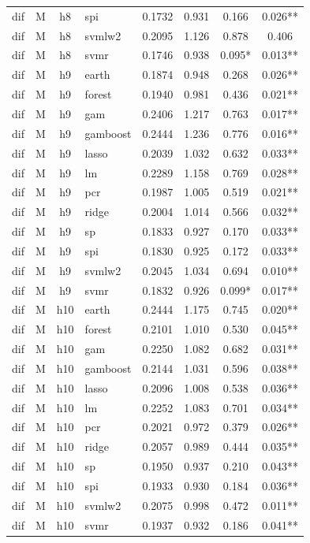 \begin{ThreePartTable}
\begin{longtable}[t]{llclcccc}
dif & M & h8 & spi & 0.1732 & 0.931 & 0.166 & 0.026**\\
dif & M & h8 & svmlw2 & 0.2095 & 1.126 & 0.878 & 0.406\\
dif & M & h8 & svmr & 0.1746 & 0.938 & 0.095* & 0.013**\\
\addlinespace
dif & M & h9 & earth & 0.1874 & 0.948 & 0.268 & 0.026**\\
dif & M & h9 & forest & 0.1940 & 0.981 & 0.436 & 0.021**\\
dif & M & h9 & gam & 0.2406 & 1.217 & 0.763 & 0.017**\\
dif & M & h9 & gamboost & 0.2444 & 1.236 & 0.776 & 0.016**\\
dif & M & h9 & lasso & 0.2039 & 1.032 & 0.632 & 0.033**\\
dif & M & h9 & lm & 0.2289 & 1.158 & 0.769 & 0.028**\\
dif & M & h9 & pcr & 0.1987 & 1.005 & 0.519 & 0.021**\\
dif & M & h9 & ridge & 0.2004 & 1.014 & 0.566 & 0.032**\\
dif & M & h9 & sp & 0.1833 & 0.927 & 0.170 & 0.033**\\
dif & M & h9 & spi & 0.1830 & 0.925 & 0.172 & 0.033**\\
dif & M & h9 & svmlw2 & 0.2045 & 1.034 & 0.694 & 0.010**\\
dif & M & h9 & svmr & 0.1832 & 0.926 & 0.099* & 0.017**\\
\addlinespace
dif & M & h10 & earth & 0.2444 & 1.175 & 0.745 & 0.020**\\
dif & M & h10 & forest & 0.2101 & 1.010 & 0.530 & 0.045**\\
dif & M & h10 & gam & 0.2250 & 1.082 & 0.682 & 0.031**\\
dif & M & h10 & gamboost & 0.2144 & 1.031 & 0.596 & 0.038**\\
dif & M & h10 & lasso & 0.2096 & 1.008 & 0.538 & 0.036**\\
dif & M & h10 & lm & 0.2252 & 1.083 & 0.701 & 0.034**\\
dif & M & h10 & pcr & 0.2021 & 0.972 & 0.379 & 0.026**\\
dif & M & h10 & ridge & 0.2057 & 0.989 & 0.444 & 0.035**\\
dif & M & h10 & sp & 0.1950 & 0.937 & 0.210 & 0.043**\\
dif & M & h10 & spi & 0.1933 & 0.930 & 0.184 & 0.036**\\
dif & M & h10 & svmlw2 & 0.2075 & 0.998 & 0.472 & 0.011**\\
dif & M & h10 & svmr & 0.1937 & 0.932 & 0.186 & 0.041**\\

\end{longtable}
\end{ThreePartTable}
